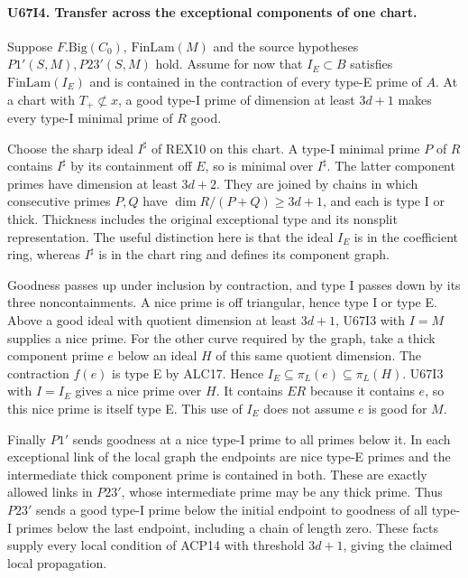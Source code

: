 \paragraph{U67I4. Transfer across the exceptional components of one chart.}
Suppose $F.\mathrm{Big}(C_0)$, $\mathrm{FinLam}(M)$ and the source hypotheses
$P1'(S,M),P23'(S,M)$ hold. Assume for now that $I_E\subset B$
satisfies $\mathrm{FinLam}(I_E)$ and is contained in the
contraction of every type-E prime of $A$.
At a chart with $T_+\not\subset x$, a good type-I prime of
dimension at least $3d+1$ makes every type-I minimal prime of
$R$ good.

Choose the sharp ideal $I^\sharp$ of REX10 on this chart. A
type-I minimal prime $P$ of $R$ contains $I^\sharp$ by its
containment off $E$, so is minimal over $I^\sharp$. The latter
component primes have dimension at least $3d+2$. They are joined
by chains in which consecutive primes $P,Q$ have
$\dim R/(P+Q)\ge3d+1$, and each is type I or thick. Thickness
includes the original exceptional type and its nonsplit
representation. The useful distinction here is that the ideal
$I_E$ is in the coefficient ring, whereas $I^\sharp$ is in the
chart ring and defines its component graph.

Goodness passes up under inclusion by contraction, and type I
passes down by its three noncontainments. A nice prime is off
triangular, hence type I or type E. Above a good ideal with
quotient dimension at least $3d+1$, U67I3 with $I=M$ supplies a
nice prime. For the other curve required by the graph, take a thick
component prime $e$ below an ideal $H$ of this same quotient
dimension. The contraction $f(e)$ is type E by ALC17. Hence
$I_E\subseteq\pi_L(e)\subseteq\pi_L(H)$. U67I3 with $I=I_E$
gives a nice prime over $H$. It contains $ER$ because it contains
$e$, so this nice prime is itself type E. This use of $I_E$ does
not assume $e$ is good for $M$.

Finally $P1'$ sends goodness at a nice type-I prime to all primes
below it. In each exceptional link of the local graph the endpoints
are nice type-E primes and the intermediate thick component prime
is contained in both. These are exactly allowed links in $P23'$,
whose intermediate prime may be any thick prime. Thus $P23'$ sends
a good type-I prime below the initial endpoint to goodness of all
type-I primes below the last endpoint, including a chain of length
zero. These facts supply every local condition of ACP14 with threshold
$3d+1$, giving the claimed local propagation.

